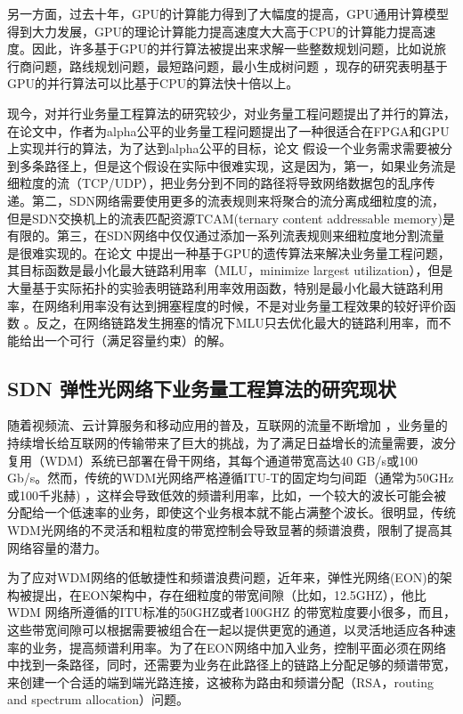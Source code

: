 \documentclass[master]{thesis-uestc}
\begin{document}
另一方面，过去十年，GPU的计算能力得到了大幅度的提高，GPU通用计算模型得到大力发展，GPU的理论计算能力提高速度大大高于CPU的计算能力提高速度。因此，许多基于GPU的并行算法被提出来求解一些整数规划问题，比如说旅行商问题，路线规划问题，最短路问题，最小生成树问题 ，现存的研究表明基于GPU的并行算法可以比基于CPU的算法快十倍以上。

现今，对并行业务量工程算法的研究较少，对业务量工程问题提出了并行的算法，在论文中，作者为alpha公平的业务量工程问题提出了一种很适合在FPGA和GPU上实现并行的算法，为了达到alpha公平的目标，论文 假设一个业务需求需要被分到多条路径上，但是这个假设在实际中很难实现，这是因为，第一，如果业务流是细粒度的流（TCP/UDP），把业务分到不同的路径将导致网络数据包的乱序传递。第二，SDN网络需要使用更多的流表规则来将聚合的流分离成细粒度的流，但是SDN交换机上的流表匹配资源TCAM(ternary content addressable memory)是有限的。第三，在SDN网络中仅仅通过添加一系列流表规则来细粒度地分割流量是很难实现的。在论文 中提出一种基于GPU的遗传算法来解决业务量工程问题，其目标函数是最小化最大链路利用率（MLU，minimize largest utilization），但是大量基于实际拓扑的实验表明链路利用率效用函数，特别是最小化最大链路利用率，在网络利用率没有达到拥塞程度的时候，不是对业务量工程效果的较好评价函数 。反之，在网络链路发生拥塞的情况下MLU只去优化最大的链路利用率，而不能给出一个可行（满足容量约束）的解。

\subsection{SDN 弹性光网络下业务量工程算法的研究现状}
随着视频流、云计算服务和移动应用的普及，互联网的流量不断增加 ，业务量的持续增长给互联网的传输带来了巨大的挑战，为了满足日益增长的流量需要，波分复用（WDM）系统已部署在骨干网络，其每个通道带宽高达40 GB/s或100 Gb/s。然而，传统的WDM光网络严格遵循ITU-T的固定均匀间距（通常为50GHz或100千兆赫) ，这样会导致低效的频谱利用率，比如，一个较大的波长可能会被分配给一个低速率的业务，即使这个业务根本就不能占满整个波长。很明显，传统WDM光网络的不灵活和粗粒度的带宽控制会导致显著的频谱浪费，限制了提高其网络容量的潜力。

为了应对WDM网络的低敏捷性和频谱浪费问题，近年来，弹性光网络(EON)的架构被提出，在EON架构中，存在细粒度的带宽间隙（比如，12.5GHZ），他比WDM 网络所遵循的ITU标准的50GHZ或者100GHZ 的带宽粒度要小很多，而且，这些带宽间隙可以根据需要被组合在一起以提供更宽的通道，以灵活地适应各种速率的业务，提高频谱利用率。为了在EON网络中加入业务，控制平面必须在网络中找到一条路径，同时，还需要为业务在此路径上的链路上分配足够的频谱带宽，来创建一个合适的端到端光路连接，这被称为路由和频谱分配（RSA，routing and spectrum allocation）问题。
\end{document}
